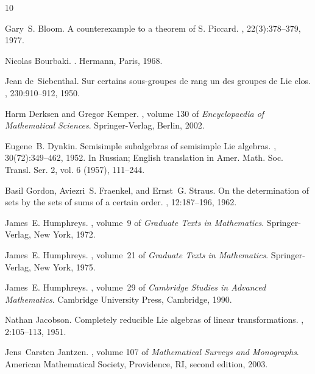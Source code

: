 \documentclass[11pt,a4paper]{article}
\theoremstyle{plain}
\theoremstyle{definition}
\begin{document}
\begin{thebibliography}{10}

Gary~S. Bloom.
\newblock A counterexample to a theorem of {S}. {P}iccard.
, 22(3):378--379, 1977.

Nicolas Bourbaki.
.
\newblock Hermann, Paris, 1968.

Jean de~Siebenthal.
\newblock Sur certains sous-groupes de rang un des groupes de {L}ie clos.
, 230:910--912, 1950.

Harm Derksen and Gregor Kemper.
, volume 130 of {\em
  Encyclopaedia of Mathematical Sciences}.
\newblock Springer-Verlag, Berlin, 2002.

Eugene~B. Dynkin.
\newblock Semisimple subalgebras of semisimple {L}ie algebras.
, 30(72):349--462, 1952.
\newblock In Russian; English translation in Amer. Math. Soc. Transl. Ser. 2,
  vol. 6 (1957), 111--244.

Basil Gordon, Aviezri~S. Fraenkel, and Ernst~G. Straus.
\newblock On the determination of sets by the sets of sums of a certain order.
, 12:187--196, 1962.

James~E. Humphreys.
,
  volume~9 of {\em Graduate Texts in Mathematics}.
\newblock Springer-Verlag, New York, 1972.

James~E. Humphreys.
, volume~21 of {\em Graduate Texts in
  Mathematics}.
\newblock Springer-Verlag, New York, 1975.

James~E. Humphreys.
, volume~29 of {\em
  Cambridge Studies in Advanced Mathematics}.
\newblock Cambridge University Press, Cambridge, 1990.

Nathan Jacobson.
\newblock Completely reducible {L}ie algebras of linear transformations.
, 2:105--113, 1951.

Jens~Carsten Jantzen.
, volume 107 of {\em
  Mathematical Surveys and Monographs}.
\newblock American Mathematical Society, Providence, RI, second edition, 2003.


\end{thebibliography}
\end{document}
